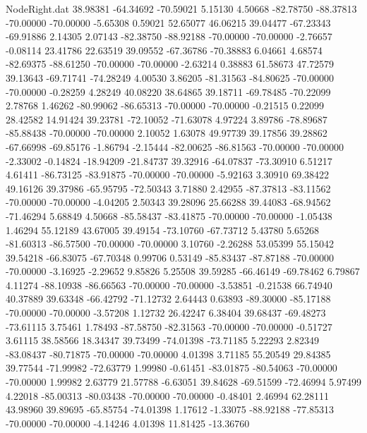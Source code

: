 \begin{filecontents}{NodeRight.dat}
  38.98381  -64.34692  -70.59021     5.15130    4.50668  -82.78750  -88.37813  -70.00000  -70.00000   -5.65308    0.59021   52.65077   46.06215
  39.04477  -67.23343  -69.91886     2.14305    2.07143  -82.38750  -88.92188  -70.00000  -70.00000   -2.76657   -0.08114   23.41786   22.63519
  39.09552  -67.36786  -70.38883     6.04661    4.68574  -82.69375  -88.61250  -70.00000  -70.00000   -2.63214    0.38883   61.58673   47.72579
  39.13643  -69.71741  -74.28249     4.00530    3.86205  -81.31563  -84.80625  -70.00000  -70.00000   -0.28259    4.28249   40.08220   38.64865
  39.18711  -69.78485  -70.22099     2.78768    1.46262  -80.99062  -86.65313  -70.00000  -70.00000   -0.21515    0.22099   28.42582   14.91424
  39.23781  -72.10052  -71.63078     4.97224    3.89786  -78.89687  -85.88438  -70.00000  -70.00000    2.10052    1.63078   49.97739   39.17856
  39.28862  -67.66998  -69.85176    -1.86794   -2.15444  -82.00625  -86.81563  -70.00000  -70.00000   -2.33002   -0.14824  -18.94209  -21.84737
  39.32916  -64.07837  -73.30910     6.51217    4.61411  -86.73125  -83.91875  -70.00000  -70.00000   -5.92163    3.30910   69.38422   49.16126
  39.37986  -65.95795  -72.50343     3.71880    2.42955  -87.37813  -83.11562  -70.00000  -70.00000   -4.04205    2.50343   39.28096   25.66288
  39.44083  -68.94562  -71.46294     5.68849    4.50668  -85.58437  -83.41875  -70.00000  -70.00000   -1.05438    1.46294   55.12189   43.67005
  39.49154  -73.10760  -67.73712     5.43780    5.65268  -81.60313  -86.57500  -70.00000  -70.00000    3.10760   -2.26288   53.05399   55.15042
  39.54218  -66.83075  -67.70348     0.99706    0.53149  -85.83437  -87.87188  -70.00000  -70.00000   -3.16925   -2.29652    9.85826    5.25508
  39.59285  -66.46149  -69.78462     6.79867    4.11274  -88.10938  -86.66563  -70.00000  -70.00000   -3.53851   -0.21538   66.74940   40.37889
  39.63348  -66.42792  -71.12732     2.64443    0.63893  -89.30000  -85.17188  -70.00000  -70.00000   -3.57208    1.12732   26.42247    6.38404
  39.68437  -69.48273  -73.61115     3.75461    1.78493  -87.58750  -82.31563  -70.00000  -70.00000   -0.51727    3.61115   38.58566   18.34347
  39.73499  -74.01398  -73.71185     5.22293    2.82349  -83.08437  -80.71875  -70.00000  -70.00000    4.01398    3.71185   55.20549   29.84385
  39.77544  -71.99982  -72.63779     1.99980   -0.61451  -83.01875  -80.54063  -70.00000  -70.00000    1.99982    2.63779   21.57788   -6.63051
  39.84628  -69.51599  -72.46994     5.97499    4.22018  -85.00313  -80.03438  -70.00000  -70.00000   -0.48401    2.46994   62.28111   43.98960
  39.89695  -65.85754  -74.01398     1.17612   -1.33075  -88.92188  -77.85313  -70.00000  -70.00000   -4.14246    4.01398   11.81425  -13.36760

\end{filecontents}
